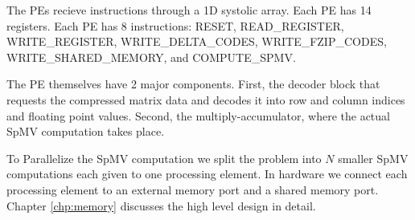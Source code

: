 The PEs recieve instructions through a 1D systolic array. Each PE has 14 registers. Each PE has 8 instructions: RESET, READ\_REGISTER, WRITE\_REGISTER, WRITE\_DELTA\_CODES, WRITE\_FZIP\_CODES, WRITE\_SHARED\_MEMORY, and COMPUTE\_SPMV.

The PE themselves have 2 major components. First, the decoder block that requests the compressed matrix data and decodes it into row and column indices and floating point values. Second, the multiply-accumulator, where the actual SpMV computation takes place.

To Parallelize the SpMV computation we split the problem into $N$ smaller SpMV computations each given to one processing element. In hardware we connect each processing element to an external memory port and a shared memory port. Chapter \ref{chp:memory} discusses the high level design in detail.
